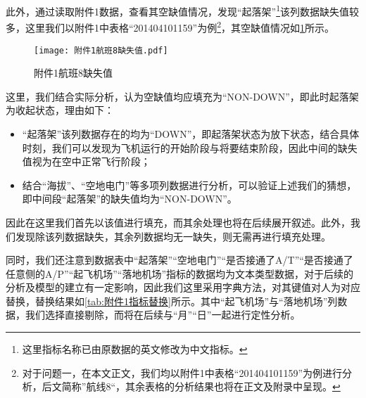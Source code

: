 \documentclass{MathorCupModeling}
\begin{document}
	此外，通过读取附件1数据，查看其空缺值情况，发现“起落架”\textcolor{blue}{\footnote{这里指标名称已由原数据的英文修改为中文指标。}}该列数据缺失值较多，这里我们以附件1中表格“201404101159”为例\textcolor{blue}{\footnote{对于问题一，在本文正文，我们均以附件1中表格“201404101159”为例进行分析，后文简称”航线8“，其余表格的分析结果也将在正文及附录中呈现。}}，其空缺值情况如\textcolor{blue}{\cref{fig:附件1航班8缺失值}}所示。
	\begin{figure}[H]
		\centering
		\texttt{[image: 附件1航班8缺失值.pdf]}
		\caption{附件1航班8缺失值}
		\label{fig:附件1航班8缺失值}
	\end{figure}
	
	这里，我们结合实际分析，认为空缺值均应填充为“NON-DOWN”，即此时起落架为收起状态，理由如下：
	\begin{itemize}
		\item “起落架”该列数据存在的均为“DOWN”，即起落架状态为放下状态，结合具体时刻，我们可以发现为飞机运行的开始阶段与将要结束阶段，因此中间的缺失值视为在空中正常飞行阶段；
		\item 结合“海拔”、“空地电门”等多项列数据进行分析，可以验证上述我们的猜想，即中间段“起落架”的缺失值均为“NON-DOWN”。
	\end{itemize}

	因此在这里我们首先以该值进行填充，而其余处理也将在后续展开叙述。此外，我们发现除该列数据缺失，其余列数据均无一缺失，则无需再进行填充处理。

	同时，我们还注意到数据表中“起落架”“空地电门”“是否接通了A/T”“是否接通了任意侧的A/P”“起飞机场”“落地机场”指标的数据均为文本类型数据，对于后续的分析及模型的建立有一定影响，因此我们这里采用字典方法，对其键值对人为对应替换，替换结果如\textcolor{blue}{\cref{tab:附件1指标替换}}所示。其中“起飞机场”与“落地机场”列数据，我们选择直接剔除，而将在后续与“月”“日”一起进行定性分析。
\begin{table}[H]
	\centering
	\caption{附件1指标替换}
	\label{tab:附件1指标替换}
\end{table}
\end{document}
